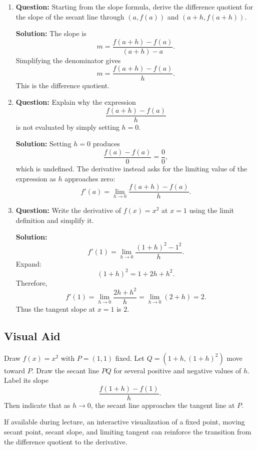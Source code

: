 \documentclass{article}
\begin{document}
\begin{enumerate}
    \item \textbf{Question:} Starting from the slope formula, derive the difference quotient for the slope of the secant line through $(a,f(a))$ and $(a+h,f(a+h))$.

    \textbf{Solution:}
    The slope is
    \[
        m=
        \frac{f(a+h)-f(a)}
        {(a+h)-a}.
    \]
    Simplifying the denominator gives
    \[
        m=
        \frac{f(a+h)-f(a)}{h}.
    \]
    This is the difference quotient.

    \item \textbf{Question:} Explain why the expression
    \[
        \frac{f(a+h)-f(a)}{h}
    \]
    is not evaluated by simply setting $h=0$.

    \textbf{Solution:}
    Setting $h=0$ produces
    \[
        \frac{f(a)-f(a)}{0}=\frac00,
    \]
    which is undefined. The derivative instead asks for the limiting value of the expression as $h$ approaches zero:
    \[
        f'(a)=
        \lim_{h\to0}
        \frac{f(a+h)-f(a)}{h}.
    \]

    \item \textbf{Question:} Write the derivative of $f(x)=x^2$ at $x=1$ using the limit definition and simplify it.

    \textbf{Solution:}
    \[
        f'(1)
        =
        \lim_{h\to0}
        \frac{(1+h)^2-1^2}{h}.
    \]
    Expand:
    \[
        (1+h)^2=1+2h+h^2.
    \]
    Therefore,
    \[
        f'(1)
        =
        \lim_{h\to0}
        \frac{2h+h^2}{h}
        =
        \lim_{h\to0}(2+h)
        =
        2.
    \]
    Thus the tangent slope at $x=1$ is $2$.
\end{enumerate}

\subsection*{Visual Aid}

\begin{tcolorbox}[title=Instructor Note]
Draw $f(x)=x^2$ with $P=(1,1)$ fixed. Let $Q=(1+h,(1+h)^2)$ move toward $P$. Draw the secant line $PQ$ for several positive and negative values of $h$. Label its slope
\[
\frac{f(1+h)-f(1)}{h}.
\]
Then indicate that as $h\to0$, the secant line approaches the tangent line at $P$.
\end{tcolorbox}

\begin{tcolorbox}[title=Interactive Visualization]
If available during lecture, an interactive visualization of a fixed point, moving secant point, secant slope, and limiting tangent can reinforce the transition from the difference quotient to the derivative.
\end{tcolorbox}
\end{document}
